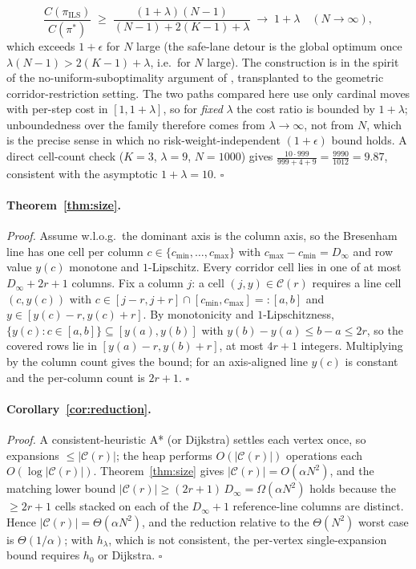 \documentclass[11pt]{article}
\begin{document}
\[
\frac{C(\pi_{\mathrm{ILS}})}{C(\pi^*)} \;\geq\; \frac{(1+\lambda)(N{-}1)}{(N{-}1) + 2(K{-}1) + \lambda} \;\longrightarrow\; 1 + \lambda \quad (N \to \infty),
\]
which exceeds $1+\epsilon$ for $N$ large (the safe-lane detour is the global optimum once $\lambda(N{-}1) > 2(K{-}1) + \lambda$, i.e.\ for $N$ large). The construction is in the spirit of the no-uniform-suboptimality argument of \citet{Pohl1970}, transplanted to the geometric corridor-restriction setting. The two paths compared here use only cardinal moves with per-step cost in $[1, 1+\lambda]$, so for \emph{fixed} $\lambda$ the cost ratio is bounded by $1+\lambda$; unboundedness over the family therefore comes from $\lambda \to \infty$, not from $N$, which is the precise sense in which no risk-weight-independent $(1+\epsilon)$ bound holds. A direct cell-count check ($K=3$, $\lambda=9$, $N=1000$) gives $\frac{10 \cdot 999}{999 + 4 + 9} = \frac{9990}{1012} = 9.87$, consistent with the asymptotic $1+\lambda = 10$. $\square$

\paragraph{Theorem~\ref{thm:size}.}
\noindent\textit{Proof.}
Assume w.l.o.g.\ the dominant axis is the column axis, so the Bresenham line has one cell per column $c \in \{c_{\min},\dots,c_{\max}\}$ with $c_{\max} - c_{\min} = D_\infty$ and row value $y(c)$ monotone and $1$-Lipschitz. Every corridor cell lies in one of at most $D_\infty + 2r + 1$ columns. Fix a column $j$: a cell $(j,y) \in \mathcal{C}(r)$ requires a line cell $(c,y(c))$ with $c \in [j-r,j+r] \cap [c_{\min},c_{\max}] =: [a,b]$ and $y \in [y(c)-r, y(c)+r]$. By monotonicity and $1$-Lipschitzness, $\{y(c): c \in [a,b]\} \subseteq [y(a), y(b)]$ with $y(b) - y(a) \leq b - a \leq 2r$, so the covered rows lie in $[y(a)-r, y(b)+r]$, at most $4r+1$ integers. Multiplying by the column count gives the bound; for an axis-aligned line $y(c)$ is constant and the per-column count is $2r+1$. $\square$

\paragraph{Corollary~\ref{cor:reduction}.}
\noindent\textit{Proof.}
A consistent-heuristic A* (or Dijkstra) settles each vertex once, so expansions $\leq |\mathcal{C}(r)|$; the heap performs $O(|\mathcal{C}(r)|)$ operations each $O(\log|\mathcal{C}(r)|)$. Theorem~\ref{thm:size} gives $|\mathcal{C}(r)| = O(\alpha N^2)$, and the matching lower bound $|\mathcal{C}(r)| \geq (2r+1)\,D_\infty = \Omega(\alpha N^2)$ holds because the $\geq 2r+1$ cells stacked on each of the $D_\infty+1$ reference-line columns are distinct. Hence $|\mathcal{C}(r)| = \Theta(\alpha N^2)$, and the reduction relative to the $\Theta(N^2)$ worst case is $\Theta(1/\alpha)$; with $h_\lambda$, which is not consistent, the per-vertex single-expansion bound requires $h_0$ or Dijkstra. $\square$
\end{document}
